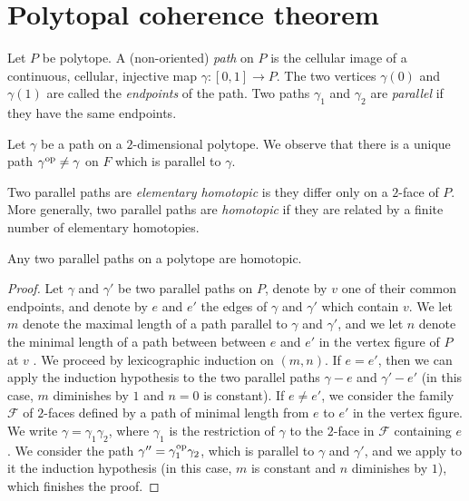 
\section{Polytopal coherence theorem} 
\label{s:polycoherence}


Let $P$ be polytope.
A (non-oriented) \emph{path} on $P$ is the cellular image of a continuous, cellular, injective map $\gamma : [0,1] \to P$. 
The two vertices $\gamma(0)$ and $\gamma(1)$ are called the \emph{endpoints} of the path. 
Two paths $\gamma_1$ and $\gamma_2$ are \emph{parallel} if they have the same endpoints. 

Let $\gamma$ be a path on a $2$-dimensional polytope. 
We observe that there is a unique path $\gamma^{\mathrm{op}} \neq \gamma$ on $F$ which is parallel to $\gamma$. 

\begin{definition}
    Two parallel paths are \emph{elementary homotopic} is they differ only on a $2$-face of $P$. 
    More generally, two parallel paths are \emph{homotopic} if they are related by a finite number of elementary homotopies.
\end{definition}

\begin{thm}
    \label{t:polytopal-coherence}
    Any two parallel paths on a polytope are homotopic. 
\end{thm}

\begin{proof}
    Let $\gamma$ and $\gamma'$ be two parallel paths on $P$, denote by $v$ one of their common endpoints, and denote by $e$ and $e'$ the edges of $\gamma$ and $\gamma'$ which contain $v$. 
    We let $m$ denote the maximal length of a path parallel to $\gamma$ and $\gamma'$, and we let $n$ denote the minimal length of a path between between $e$ and $e'$ in the vertex figure of $P$ at $v$ \cite[Section 2.1]{Ziegler95}.
    We proceed by lexicographic induction on $(m,n)$. 
    If $e=e'$, then we can apply the induction hypothesis to the two parallel paths $\gamma - e$ and $\gamma' - e'$ (in this case, $m$ diminishes by $1$ and $n=0$ is constant). 
    If $e \neq e'$, we consider the family $\mathcal{F}$ of $2$-faces defined by a path of minimal length from $e$ to $e'$ in the vertex figure. 
    We write $\gamma = \gamma_1 \gamma_2$, where $\gamma_1$ is the restriction of $\gamma$ to the $2$-face in $\mathcal{F}$ containing $e$. 
    We consider the path $\gamma''=\gamma_1^{\mathrm{op}} \gamma_2$, which is parallel to $\gamma$ and $\gamma'$, and we apply to it the induction hypothesis (in this case, $m$ is constant and $n$ diminishes by $1$), which finishes the proof. 
\end{proof}

